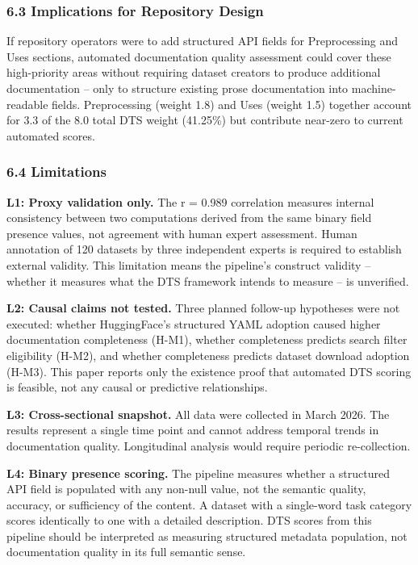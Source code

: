 \subsubsection{6.3 Implications for Repository Design}

If repository operators were to add structured API fields for Preprocessing and Uses sections, automated documentation quality assessment could cover these high-priority areas without requiring dataset creators to produce additional documentation -- only to structure existing prose documentation into machine-readable fields. Preprocessing (weight 1.8) and Uses (weight 1.5) together account for 3.3 of the 8.0 total DTS weight (41.25\%) but contribute near-zero to current automated scores.

\subsubsection{6.4 Limitations}

\textbf{L1: Proxy validation only.} The r = 0.989 correlation measures internal consistency between two computations derived from the same binary field presence values, not agreement with human expert assessment. Human annotation of 120 datasets by three independent experts is required to establish external validity. This limitation means the pipeline's construct validity -- whether it measures what the DTS framework intends to measure -- is unverified.

\textbf{L2: Causal claims not tested.} Three planned follow-up hypotheses were not executed: whether HuggingFace's structured YAML adoption caused higher documentation completeness (H-M1), whether completeness predicts search filter eligibility (H-M2), and whether completeness predicts dataset download adoption (H-M3). This paper reports only the existence proof that automated DTS scoring is feasible, not any causal or predictive relationships.

\textbf{L3: Cross-sectional snapshot.} All data were collected in March 2026. The results represent a single time point and cannot address temporal trends in documentation quality. Longitudinal analysis would require periodic re-collection.

\textbf{L4: Binary presence scoring.} The pipeline measures whether a structured API field is populated with any non-null value, not the semantic quality, accuracy, or sufficiency of the content. A dataset with a single-word task category scores identically to one with a detailed description. DTS scores from this pipeline should be interpreted as measuring structured metadata population, not documentation quality in its full semantic sense.

